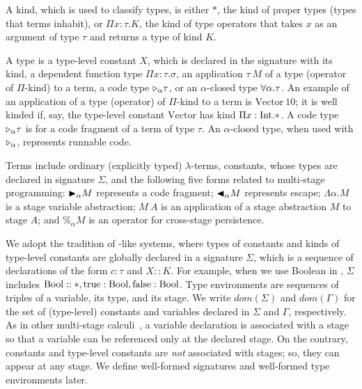 
A kind, which is used to classify types, is either $*$, the kind of
proper types (types that terms inhabit), or $\Pi x\colon\tau.K$, the kind
of type operators that takes $x$ as an argument of type $\tau$ and returns a type
of kind $K$.


A type is a type-level constant $X$, which is declared in the signature with
its kind, a dependent function type $\Pi x:\tau.\sigma$, an application $\tau\
M$ of a type (operator of $\Pi$-kind) to a term, a code type ${\mathop{\triangleright}}_\alpha \tau$,
or an $\alpha$-closed type $\forall\alpha.\tau$.  An example of an application of a
type (operator) of $\Pi$-kind to a term is $\text{Vector}\ 10$; it is well
kinded if, say, the type-level constant $\text{Vector}$ has kind $\Pi x:\textrm{Int}.*$.
A code type ${\mathop{\triangleright}}_\alpha \tau$ is for a code fragment of a term of type $\tau$.
An $\alpha$-closed type, when used with ${\mathop{\triangleright}}_\alpha$, represents runnable code.


Terms include ordinary (explicitly typed) \(\lambda\)-terms, constants, whose
types are declared in signature $\Sigma$, and the following five forms related
to multi-stage programming: ${\mathop{\blacktriangleright}}_\alpha M$ represents a code fragment;
${\mathop{\blacktriangleleft}}_\alpha M$ represents escape; $\Lambda\alpha.M$ is a stage variable
abstraction; $M\ A$ is an application of a stage abstraction $M$ to stage $A$;
and $\%_\alpha M$ is an operator for cross-stage persistence.


We adopt the tradition of \LLF-like systems, where types of constants and
kinds of type-level constants are globally declared in a signature $\Sigma$,
which is a sequence of declarations of the form $c:\tau$ and $X::K$. For
example, when we use Boolean in \LMD, $\Sigma$ includes $\textrm{Bool} :: *,
\textrm{true}:\textrm{Bool}, \textrm{false}:\textrm{Bool}$. Type environments are sequences of
triples of a variable, its type, and its stage. We write
\(\textit{dom}(\Sigma)\) and \(\textit{dom}(\Gamma)\) for the set of
(type-level) constants and variables declared in \(\Sigma\) and \(\Gamma\),
respectively. As in other multi-stage
calculi~\cite{TahaNielsen2003Environment,TsukadaIgarashi2010Logical,HanadaIgarashi2014CSP}, a variable declaration
is associated with a stage so that a variable can be referenced only at the
declared stage. On the contrary, constants and type-level constants are
\emph{not} associated with stages; so, they can appear at any stage. We
define well-formed signatures and well-formed type environments later.

